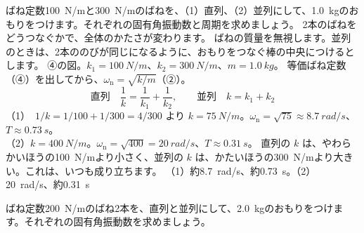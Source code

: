 \label{ph:波-1:ex6}
\begin{phreidai}
ばね定数\qty{100}{N/m}と\qty{300}{N/m}のばねを、（1）直列、（2）並列にして、\qty{1.0}{kg}のおもりをつけます。それぞれの固有角振動数と周期を求めましょう。
\phbamen
2本のばねをどうつなぐかで、全体のかたさが変わります。
\phmushi
ばねの質量を無視します。並列のときは、2本ののびが同じになるように、おもりをつなぐ棒の中央につけるとします。
\phzu
④の図。$k_1=\qty{100}{N/m}$、$k_2=\qty{300}{N/m}$、$m=\qty{1.0}{kg}$。
\phriyu
等価ばね定数（④）を出してから、$\omega_{\mathrm n}=\sqrt{k/m}$（②）。
\phtateru
\[\text{直列}\quad\frac{1}{k}=\frac{1}{k_1}+\frac{1}{k_2},\qquad\text{並列}\quad k=k_1+k_2\]
\phtoku
（1）\ $1/k=1/100+1/300=4/300$ より $k=\qty{75}{N/m}$。$\omega_{\mathrm n}=\sqrt{75}\approx\qty{8.7}{rad/s}$、$T\approx\qty{0.73}{s}$。\\
（2）$k=\qty{400}{N/m}$。$\omega_{\mathrm n}=\sqrt{400}=\qty{20}{rad/s}$、$T\approx\qty{0.31}{s}$。
\phtashikame
直列の $k$ は、やわらかいほうの\qty{100}{N/m}より小さく、並列の $k$ は、かたいほうの\qty{300}{N/m}より大きい。これは、いつも成り立ちます。
\kotae （1）約\qty{8.7}{rad/s}、約\qty{0.73}{s}。（2）\qty{20}{rad/s}、約\qty{0.31}{s}
\end{phreidai}
\begin{jibun}
ばね定数\qty{200}{N/m}のばね2本を、直列と並列にして、\qty{2.0}{kg}のおもりをつけます。それぞれの固有角振動数を求めましょう。
\end{jibun}

